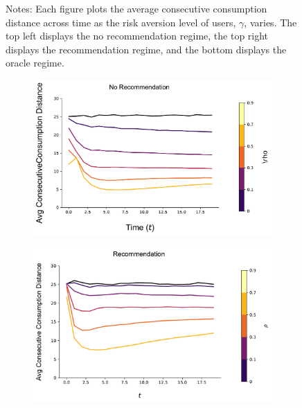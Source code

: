 \documentclass[format=acmsmall, review=true]{acmart}
\begin{document}
\begin{figure}[H]
\begin{subfigure}{.45\textwidth}
\end{subfigure}%
\caption*{\scriptsize Notes: Each figure plots the average consecutive consumption distance across time as the risk aversion level of users, $\gamma$, varies. The top left displays the no recommendation regime, the top right displays the recommendation regime, and the bottom displays the oracle regime.}
\label{fig:no_rec_risk_aversion}
\end{figure}

\addtocounter{figure}{-1}

\begin{figure}[H]
\caption{Relationship between Local Consumption and $\rho$, $N = 500$}
\begin{subfigure}{.45\textwidth}
\includegraphics[width=\linewidth]{figures/rho_consumption_dist_N_100T_20.pdf}
\end{subfigure}
\begin{subfigure}{.45\textwidth}
\includegraphics[width=\linewidth]{figures/rho_consumption_dist_N_100T_20_partial.pdf}

\end{subfigure}
\end{figure}
\end{document}
